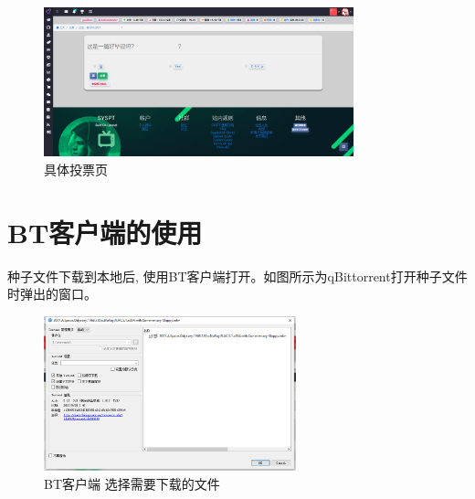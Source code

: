 

\begin{figure}[h]
    \centering
    \includegraphics[width=0.8\textwidth]{support-files/5.x-poll-poll-page.png}
    \caption{具体投票页}
    \label{fig:pollpollpage}
\end{figure}

\section{BT客户端的使用}

种子文件下载到本地后, 使用BT客户端打开。如图所示为qBittorrent打开种子文件时弹出的窗口。

\begin{figure}[h]
    \centering
    \includegraphics[width=0.65\textwidth]{support-files/5.4-bt-client-1.png}
    \caption{BT客户端 选择需要下载的文件}
    \label{fig:btclient1}
\end{figure}

